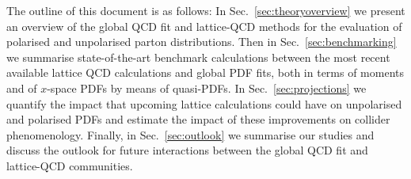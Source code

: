 The outline of this document is as follows:
%
In Sec.~\ref{sec:theoryoverview} we present an overview of
the global QCD fit and lattice-QCD methods for the evaluation
of polarised and unpolarised parton distributions.
%
Then in Sec.~\ref{sec:benchmarking}
we summarise state-of-the-art benchmark
calculations between the most
recent available lattice QCD calculations and global PDF fits,
both in terms of moments and of $x$-space PDFs by means of
quasi-PDFs.
%
In Sec.~\ref{sec:projections} we quantify the impact that
upcoming lattice calculations could have on unpolarised
and polarised PDFs and estimate the impact of these improvements
on collider phenomenology.
%
Finally, in Sec.~\ref{sec:outlook} we summarise our studies
and discuss the outlook for future interactions between
the global QCD fit and lattice-QCD communities.
